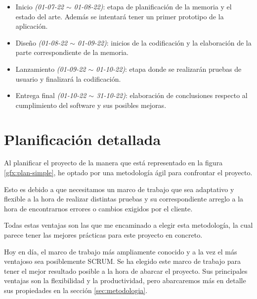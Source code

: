 \newpage

\begin{itemize}
    \item Inicio \textit{(01-07-22 $\sim$ 01-08-22)}: etapa de planificación de la memoria y el estado del arte. Además se intentará tener un primer prototipo de la aplicación.
    \item Diseño \textit{(01-08-22 $\sim$ 01-09-22)}: inicios de la codificación y la elaboración de la parte correspondiente de la memoria.
    \item Lanzamiento \textit{(01-09-22 $\sim$ 01-10-22)}: etapa donde se realizarán pruebas de usuario y finalizará la codificación.
    \item Entrega final \textit{(01-10-22 $\sim$ 31-10-22)}: elaboración de conclusiones respecto al cumplimiento del software y sus posibles mejoras.
\end{itemize}

\section{Planificación detallada}\label{ch:planificacion_detallada}

Al planificar el proyecto de la manera que está representado en la figura \ref{gfx:plan-simple}, he optado por una metodología ágil para confrontar el proyecto.

\vspace{0.3cm}

Esto es debido a que necesitamos un marco de trabajo que sea adaptativo y flexible a la hora de realizar distintas pruebas y su correspondiente arreglo a la hora de encontrarnos errores o cambios exigidos por el cliente.

\vspace{0.3cm}

Todas estas ventajas son las que me encaminado a elegir esta metodología, la cual parece tener las mejores prácticas para este proyecto en concreto.

\vspace{0.3cm}

Hoy en día, el marco de trabajo más ampliamente conocido y a la vez el más ventajoso sea posiblemente SCRUM. Se ha elegido este marco de trabajo para tener el mejor resultado posible a la hora de abarcar el proyecto. Sus principales ventajas son la flexibilidad y la productividad, pero abarcaremos más en detalle sus propiedades en la sección \ref{sec:metodologia}.

\vspace{0.3cm}

